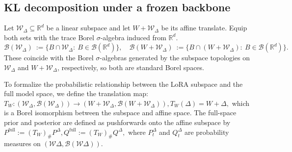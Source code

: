 \documentclass{article}
\theoremstyle{plain}
\theoremstyle{definition}
\theoremstyle{remark}
\begin{document}
\subsection{KL decomposition under a frozen backbone}
\label{sec:kl-decomp-pecl}



Let $\mathcal W_\Delta\subseteq\mathbb R^d$ be a linear subspace and let $W+\mathcal W_\Delta$ be its affine translate. Equip both sets with the trace Borel $\sigma$-algebra induced from $\mathbb R^d$. $
\mathcal B(\mathcal W_\Delta)\ :=\{B\cap \mathcal W_\Delta:\ B\in \mathcal B(\mathbb R^d)\},\quad
\mathcal B(W+\mathcal W_\Delta)\ :=\{B\cap (W+\mathcal W_\Delta):\ B\in \mathcal B(\mathbb R^d)\}.
$
These coincide with the Borel $\sigma$-algebras generated by the subspace topologies on $\mathcal W_\Delta$ and $W+\mathcal W_\Delta$, respectively, so both are standard Borel spaces.


To formalize the probabilistic relationship between the LoRA subspace and the full model space, we define the translation map:
$T_W: (\mathcal W_\Delta,\mathcal B(\mathcal W_\Delta)) \to (W+\mathcal W_\Delta,\mathcal B(W+\mathcal W_\Delta)), 
T_W(\Delta)=W+\Delta,$
which is a Borel isomorphism between the subspace and affine space.  The full-space prior and posterior are defined as pushforwards onto the affine subspace by
$
P^{\mathrm{full}}:=(T_W)_{\text{\#}} P^{\Delta},
Q^{\mathrm{full}}:=(T_W)_{\text{\#}} Q^{\Delta},
$
where $P_t^{\Delta}$ and $Q_t^{\Delta}$ are probability measures on $(\mathcal{W}\Delta, \mathcal{B}(\mathcal{W}\Delta))$.
\end{document}
